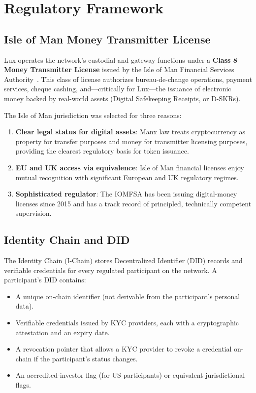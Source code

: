 \section{Regulatory Framework}

\label{sec:compliance}

\subsection{Isle of Man Money Transmitter License}

Lux operates the network's custodial and gateway functions under a
\textbf{Class 8 Money Transmitter License} issued by the Isle of Man
Financial Services Authority~\cite{iomfsa,cdax}. This class of
license authorizes bureau-de-change operations, payment services,
cheque cashing, and---critically for Lux---the issuance of
electronic money backed by real-world assets (Digital Safekeeping
Receipts, or D-SKRs).

The Isle of Man jurisdiction was selected for three reasons:

\begin{enumerate}[nosep]
  \item \textbf{Clear legal status for digital assets}: Manx law
        treats cryptocurrency as property for transfer purposes and
        money for transmitter licensing purposes, providing the
        clearest regulatory basis for token issuance.
  \item \textbf{EU and UK access via equivalence}: Isle of Man
        financial licenses enjoy mutual recognition with significant
        European and UK regulatory regimes.
  \item \textbf{Sophisticated regulator}: The IOMFSA has been issuing
        digital-money licenses since 2015 and has a track record of
        principled, technically competent supervision.
\end{enumerate}

\subsection{Identity Chain and DID}

The Identity Chain (I-Chain) stores Decentralized Identifier (DID)
records and verifiable credentials for every regulated participant
on the network. A participant's DID contains:

\begin{itemize}[nosep]
  \item A unique on-chain identifier (not derivable from the
        participant's personal data).
  \item Verifiable credentials issued by KYC providers, each with a
        cryptographic attestation and an expiry date.
  \item A revocation pointer that allows a KYC provider to revoke a
        credential on-chain if the participant's status changes.
  \item An accredited-investor flag (for US participants) or
        equivalent jurisdictional flags.
\end{itemize}

